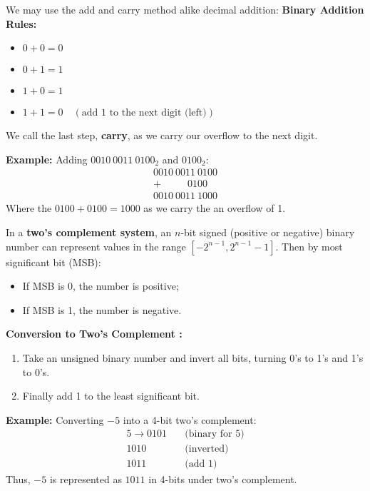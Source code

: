 \begin{theo}

    We may use the add and carry method alike decimal addition:
    \textbf{Binary Addition Rules:}
    \begin{itemize}
        \item $0 + 0 = 0$
        \item $0 + 1 = 1$
        \item $1 + 0 = 1$
        \item $1 + 1 = 0 \quad (\text{add 1 to the next digit (left)})$
    \end{itemize}
    \noindent
    We call the last step, \textbf{carry}, as we carry our overflow to the next digit.
\end{theo}
    \newpage

    \noindent
    \textbf{Example:} Adding $0010\ 0011\ 0100_2$ and $0100_2$:
    \[
    \begin{array}{r}
    0010\ 0011\ 0100 \\
    + \quad\quad\ \ \ 0100 \\
    \hline
    0010\ 0011\ 1000
    \end{array}
    \]
\noindent
Where the $0100+0100=1000$ as we carry the an overflow of 1. 

\begin{theo}
    
    In a \textbf{two's complement system}, an $n$-bit signed (positive or negative) binary number can represent values in the range $[-2^{n-1}, 2^{n-1}-1]$. Then by most significant bit (MSB):
    \begin{itemize}
        \item If MSB is 0, the number is positive;
        \item If MSB is 1, the number is negative.
    \end{itemize}
    \noindent
    \textbf{Conversion to Two's Complement :}
    \begin{enumerate}
        \item Take an unsigned binary number and invert all bits, turning 0's to 1's and 1's to 0's.
        \item Finally add 1 to the least significant bit.
    \end{enumerate}
\end{theo}
\textbf{Example:} Converting $-5$ into a 4-bit two's complement:
    \begin{align*}
        5 \rightarrow 0101 \quad & \text{(binary for 5)} \\
         1010 \quad & \text{(inverted)} \\
         1011 \quad & \text{(add 1)}
    \end{align*}
    Thus, $-5$ is represented as $1011$ in 4-bits under two's complement.

    
